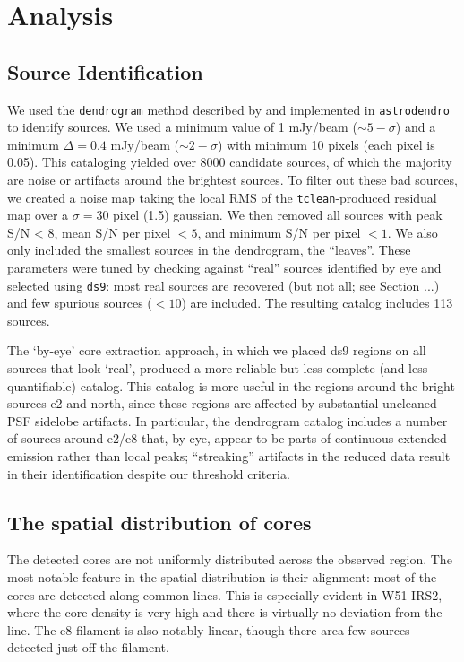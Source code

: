 \documentclass{aa}
\begin{document}
\section{Analysis}
\subsection{Source Identification}
We used the \texttt{dendrogram} method described by \citet{Rosolowsky2008c} and
implemented in \texttt{astrodendro} to identify sources.  We used a minimum
value of 1 mJy/beam ($\sim5-\sigma$) and a minimum $\Delta=0.4$ mJy/beam
($\sim2-\sigma$) with minimum 10 pixels (each pixel is 0.05\arcsec).  This
cataloging yielded over 8000 candidate sources, of which the majority are noise
or artifacts around the brightest sources.  To filter out these bad sources,
we created a noise map taking the local RMS of the \texttt{tclean}-produced
residual map over a $\sigma=30$ pixel (1.5\arcsec) gaussian.  We then removed
all sources with peak S/N < 8, mean S/N per pixel $< 5$, and minimum S/N per
pixel $ < 1$.  We also only included the smallest sources in the dendrogram,
the ``leaves''.  These parameters were tuned by checking against ``real''
sources identified by eye and selected using \texttt{ds9}: most real sources are
recovered (but not all; see Section ...) and few spurious sources ($<10$) are
included.  The resulting catalog includes 113 sources.

The `by-eye' core extraction approach, in which we placed ds9 regions on all
sources that look `real', produced a more reliable but less complete (and less
quantifiable) catalog.  This catalog is more useful in the regions around the
bright sources e2 and north, since these regions are affected by substantial
uncleaned PSF sidelobe artifacts.  In particular, the dendrogram catalog includes
a number of sources around e2/e8 that, by eye, appear to be parts of continuous
extended emission rather than local peaks; ``streaking'' artifacts in the
reduced data result in their identification despite our threshold criteria.

\subsection{The spatial distribution of cores}
The detected cores are not uniformly distributed across the observed region.
The most notable feature in the spatial distribution is their alignment: most
of the cores are detected along common lines.  This is especially evident
in W51 IRS2, where the core density is very high and there is virtually no
deviation from the line.  The e8 filament is also notably linear, though there
area few sources detected just off the filament. 
\end{document}
